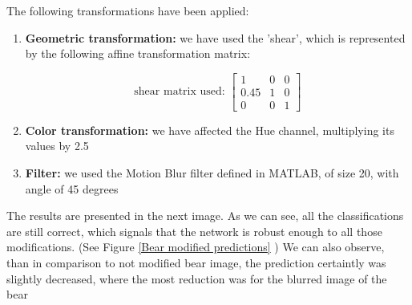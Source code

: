 \documentclass[a4paper]{iacas}
\begin{document}
\subsubsection{}
The following transformations have been applied:

\begin{enumerate}
\item \textbf{Geometric transformation: } we have used the 'shear', which is represented by the following affine transformation matrix:

\begin{equation*}
\text{shear matrix used: }
\left[
\begin{matrix}
1 & 0 & 0 \\
0.45 & 1 & 0 \\
0 & 0 & 1
\end{matrix}
\right]
\end{equation*}

\item \textbf{Color transformation: } we have affected the Hue channel, multiplying its values by 2.5
\item \textbf{Filter: } we used the Motion Blur filter defined in MATLAB, of size 20, with angle of 45 degrees
\end{enumerate}

The results are presented in the next image. As we can see, all the classifications are still correct, which signals that the network is robust enough to all those modifications. (See Figure  \ref{Bear modified predictions} )  We can also observe, than in comparison to not modified bear image, the prediction certaintly was slightly decreased, where the most reduction was for the blurred image of the bear
\end{document}
